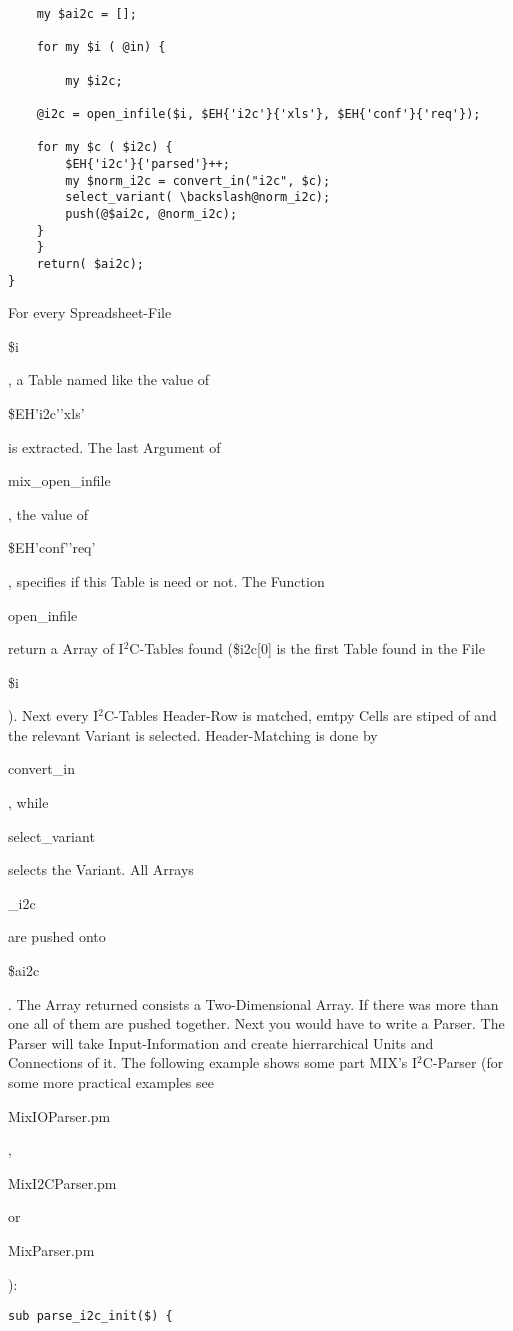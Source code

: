 \documentclass[a4paper,12pt]{article}
\begin{document}
\begin{tt}
\begin{verbatim}
    my $ai2c = [];

    for my $i ( @in) {
     
        my $i2c;

	@i2c = open_infile($i, $EH{'i2c'}{'xls'}, $EH{'conf'}{'req'});

	for my $c ( $i2c) {
	    $EH{'i2c'}{'parsed'}++;
	    my $norm_i2c = convert_in("i2c", $c);
	    select_variant( \backslash@norm_i2c);
	    push(@$ai2c, @norm_i2c);
	}
    }
    return( $ai2c);
}
\end{verbatim}
For every Spreadsheet-File \begin{tt}\$i\end{tt}, a Table named like the value of \begin{tt}\$EH{'i2c'}{'xls'}\end{tt} is extracted. The last Argument of \begin{tt}mix_open_infile\end{tt}, the value of\begin{tt}\$EH{'conf'}{'req'}\end{tt}, specifies if this Table is need or not. The Function \begin{tt}open_infile\end{tt} return a Array of I$^2$C-Tables found (\$i2c[0] is the first Table found in the File \begin{tt}\$i\end{tt}). Next every I$^2$C-Tables Header-Row is matched, emtpy Cells are stiped of and the relevant Variant is selected. Header-Matching is done by \begin{tt}convert_in\end{tt}, while \begin{tt}select_variant\end{tt} selects the Variant. All Arrays \begin{tt}\@norm_i2c\end{tt} are pushed onto \begin{tt}\@\$ai2c\end{tt}. The Array returned consists a Two-Dimensional Array. If there was more than one all of them are pushed together.\newline
Next you would have to write a Parser. The Parser will take Input-Information and create hierrarchical Units and Connections of it. The following example shows some part MIX's I$^2$C-Parser (for some more practical examples see \begin{tt}MixIOParser.pm\end{tt}, \begin{tt}MixI2CParser.pm\end{tt} or \begin{tt}MixParser.pm\end{tt}):
\begin{verbatim}
sub parse_i2c_init($) {


\end{verbatim}
\end{tt}
\end{document}
